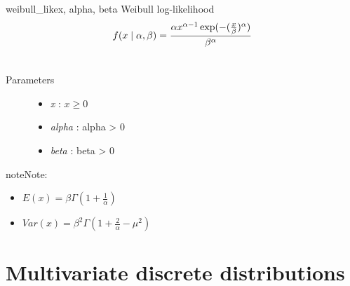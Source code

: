 \hypertarget{pymc.distributions.weibull_like}{}\begin{funcdesc}{weibull\_like}{x, alpha, beta}
Weibull log-likelihood
\begin{gather}
\begin{split}f(x \mid \alpha, \beta) = \frac{\alpha x^{\alpha - 1}
\exp(-(\frac{x}{\beta})^{\alpha})}{\beta^\alpha}\end{split}\notag\\\begin{split}\end{split}\notag
\end{gather}\begin{description}
\item[Parameters] \leavevmode\begin{itemize}
\item {} 
\emph{x} : $x \ge 0$

\item {} 
\emph{alpha} : alpha \textgreater{} 0

\item {} 
\emph{beta} : beta \textgreater{} 0

\end{itemize}

\end{description}

\begin{notice}{note}{Note:}\begin{itemize}
\item {} 
$E(x)=\beta \Gamma(1+\frac{1}{\alpha})$

\item {} 
$Var(x)=\beta^2 \Gamma(1+\frac{2}{\alpha} - \mu^2)$

\end{itemize}
\end{notice}
\end{funcdesc}


\section{Multivariate discrete distributions}

